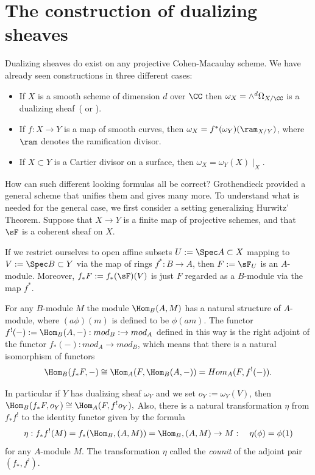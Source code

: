 \section{The construction of dualizing sheaves}\label{dualizing sheaves section}
Dualizing sheaves do exist on any projective Cohen-Macaulay scheme. We have already seen constructions
in three different cases:
\begin{itemize}
 \item If $X$ is a smooth scheme of dimension $d$ over $\CC$ then $\omega_{X}= \wedge^{d} \Omega_{X/\CC}$
is a dualizing sheaf~(\cite[Hartshorne[Section III.7]{Hartshorne1977} or  \cite[p. 648, 708]{Griffiths-Harris1978}). 
\item If $f: X\to Y$ is a map of smooth curves, then $\omega_{X} = f^{*}(\omega_{Y})(\ram_{X/Y})$, where
$\ram$ denotes the ramification divisor.
\item If $X\subset Y$ is a Cartier divisor on a surface, then $\omega_{X} = \omega_{Y}(X)\mid_{X}$.
\end{itemize}

How can such different looking formulas all be correct? Grothendieck provided a general scheme
that unifies them and gives many more. 
To understand what is needed for the general case, we first consider a setting generalizing Hurwitz' Theorem.
Suppose that $X\to Y$ is a finite map of projective schemes, and that $\sF$ is a coherent sheaf on $X$.

If we restrict ourselves to open affine subsets
$U := \Spec A\subset X$ mapping to $V:= \Spec B\subset Y$ via the map of rings $f^{*}:B\to A$, then 
$F := \sF_{U}$ is an $A$-module. Moreover,
$f_*{F} := f_*(\sF)(V)$ is just $F$ regarded as a $B$-module via the map $f^{*}$.

For any $B$-module $M$ the module $\Hom_{B}(A, M)$ has a natural structure of $A$-module,
where $(a\phi)(m)$ is defined to be $\phi(am)$. The functor $f^{!}(-) := \Hom_{B}(A, -): mod_{B}:\to mod_{A}$ 
defined in this way is the right adjoint of the functor $f_{*}(-): mod_{A}\to mod_{B}$, 
which means that there is a natural isomorphism of functors
$$
\Hom_{B}(f_{*}F, -) \cong \Hom_{A}(F, \Hom_{B}(A, -)) = Hom_{A}(F, f^{!}(-)).
$$

In particular if $Y$ has dualizing sheaf $\omega_Y$ and we set $o_Y := \omega_Y(V)$, then
$
\Hom_{B}(f_{*}F, o_{Y}) \cong \Hom_{A}(F, f^{!}o_{Y}),
$
Also, there is a natural transformation $\eta$ from $ f_{*}f^{!}$ to the identity functor given by the formula
$$
\eta: f_{*}f^{!}(M) = f_{*}(\Hom_{B}, (A,M)) = \Hom_{B}, (A,M) \to M:\quad \eta(\phi) = \phi(1)
$$
for any $A$-module $M$. 
The transformation $\eta$ called the \emph{counit} of the adjoint pair $(f_{*}, f^{!})$.

